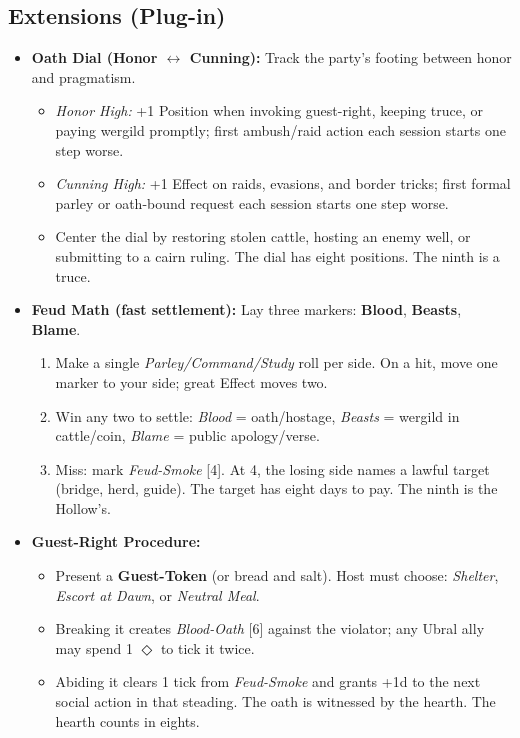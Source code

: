 \subsection*{Extensions (Plug-in)}
\label{sec:ubral-extensions}
\begin{itemize}
  \item \textbf{Oath Dial (Honor \(\leftrightarrow\) Cunning):} Track the party's footing between honor and pragmatism.
  \begin{itemize}
    \item \emph{Honor High:} +1 Position when invoking guest-right, keeping truce, or paying wergild promptly; first ambush/raid action each session starts one step worse.
    \item \emph{Cunning High:} +1 Effect on raids, evasions, and border tricks; first formal parley or oath-bound request each session starts one step worse.
    \item Center the dial by restoring stolen cattle, hosting an enemy well, or submitting to a cairn ruling. The dial has eight positions. The ninth is a truce.
  \end{itemize}

  \item \textbf{Feud Math (fast settlement):} Lay three markers: \textbf{Blood}, \textbf{Beasts}, \textbf{Blame}.
  \begin{enumerate}
    \item Make a single \emph{Parley/Command/Study} roll per side. On a hit, move one marker to your side; great Effect moves two.
    \item Win any two to settle: \emph{Blood} = oath/hostage, \emph{Beasts} = wergild in cattle/coin, \emph{Blame} = public apology/verse.
    \item Miss: mark \emph{Feud-Smoke} [4]. At 4, the losing side names a lawful target (bridge, herd, guide). The target has eight days to pay. The ninth is the Hollow's.
  \end{enumerate}

  \item \textbf{Guest-Right Procedure:}
  \begin{itemize}
    \item Present a \textbf{Guest-Token} (or bread and salt). Host must choose: \emph{Shelter}, \emph{Escort at Dawn}, or \emph{Neutral Meal}.
    \item Breaking it creates \emph{Blood-Oath} [6] against the violator; any Ubral ally may spend 1 \(\Diamond\) to tick it twice.
    \item Abiding it clears 1 tick from \emph{Feud-Smoke} and grants +1d to the next social action in that steading. The oath is witnessed by the hearth. The hearth counts in eights.
  \end{itemize}


\end{itemize}

